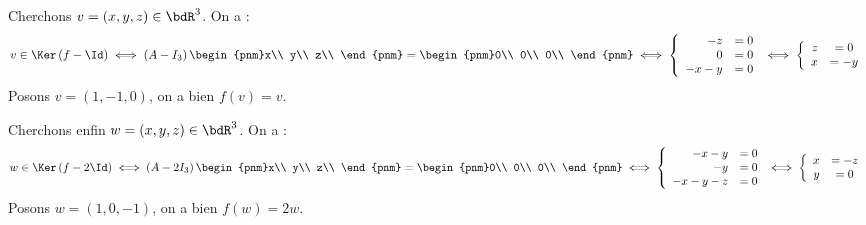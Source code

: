 \documentclass[a4paper,french,bookmarks]{article}
\begin{document}
\begin{enumerate}
{\begin{enumerate}
    \itt Cherchons $v = \left(x, y, z\right) \in \bdR^3$. On a :
    \[v \in \Ker\left(f-\Id\right) \iff \left(A-I_3\right)\begin{pnm}x\\
    y\\
    z\\
    \end{pnm} = \begin{pnm}0\\
    0\\
    0\\
    \end{pnm} \iff \left\lbrace\begin{array}{rcl}
        -z &= 0  \\
        0 &= 0 \\
        -x -y &= 0
    \end{array}\right. \iff \left\lbrace\begin{array}{rcl}
        z &= 0  \\
        x &= -y \\
    \end{array}\right.\]
    Posons $v = \left(1, -1, 0\right)$, on a bien $f\left(v\right) = v$.
    
    \itt Cherchons enfin $w = \left(x, y, z\right) \in \bdR^3$. On a :
    \[w \in \Ker\left(f-2\Id\right) \iff \left(A-2I_3\right)\begin{pnm}x\\
    y\\
    z\\
    \end{pnm} = \begin{pnm}0\\
    0\\
    0\\
    \end{pnm} \iff \left\lbrace\begin{array}{rcl}
        -x - y &= 0  \\
        -y &= 0 \\
        -x -y -z &= 0
    \end{array}\right. \iff \left\lbrace\begin{array}{rcl}
        x &= -z  \\
        y &= 0 \\
    \end{array}\right.\]
    Posons $w = \left(1, 0, -1\right)$, on a bien $f\left(w\right) = 2w$.
    \end{enumerate}
    
}
\end{enumerate}
\end{document}

